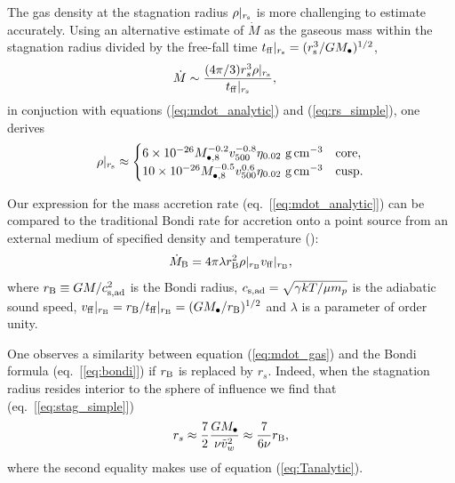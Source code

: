 \documentclass[usenatbib,fleqn]{mn2e}
\newcommand{\rs}{r_s}
\newcommand{\vw}{\tilde{v}_{w}}
\newcommand{\Mbh}[1][]{M_{\bullet#1}}
\newcommand{\Mbheight}{M_{\bullet,8}}
\newcommand{\tff}{t_{\rm ff}}
\newcommand{\densSlope}{\nu}
\begin{document}
The gas density at the stagnation radius $\rho|_{r_{\rm s}}$ is more challenging to estimate accurately.  Using an alternative estimate of $\dot{M}$ as the gaseous mass within the stagnation radius divided by the free-fall time $t_{\rm ff}|_{r_{\rm s}} = (r_{\rm s}^{3}/GM_{\bullet})^{1/2}$,
\begin{align}
  &\dot{M}\sim\frac{(4 \pi/3) \rs^3 \rho|_{r_{\rm s}}}{\tff|_{r_{\rm s}}},
  \label{eq:mdot_gas}
\end{align}
 in conjuction with equations (\ref{eq:mdot_analytic}) and (\ref{eq:rs_simple}), one derives
\begin{align}
  \rho|_{r_{\rm s}}\approx
  \begin{cases}
    6 \times 10^{-26} \Mbheight^{-0.2} v_{500}^{-0.8}  \eta_{0.02} \,
    \, {\rm g \, cm^{-3}}& \text{core},\\
    10 \times 10^{-26}  \Mbheight^{-0.5} v_{500}^{0.6}  \eta_{0.02} \,\, {\rm g \,cm^{-3}} & \text{cusp}.
  \end{cases}
  \label{eq:rhors}
\end{align}


Our expression for the mass accretion rate (eq.~[\ref{eq:mdot_analytic}]) can be compared to the traditional Bondi rate for accretion onto a point source from an external medium of specified density and temperature (\citealt{Bondi52}):
\begin{align}
  \dot{M}_{\rm B} =4\pi \lambda r_{\rm B}^2 \rho|_{r_{\rm B}}v_{\rm ff}|_{r_{\rm B}},
\label{eq:bondi}
\end{align}
where $r_{\rm B} \equiv GM/c_{\rm s,ad}^{2}$ is the Bondi radius, $c_{\rm s,ad} = \sqrt{\gamma kT/\mu m_p}$ is the adiabatic sound speed, $v_{\rm ff}|_{r_{\rm B}} = r_{\rm B}/t_{\rm ff}|_{r_{\rm B}} = (GM_{\bullet}/r_{\rm B})^{1/2}$ and $\lambda$ is a parameter of order unity.  

One observes a similarity between equation (\ref{eq:mdot_gas}) and the Bondi formula (eq.~[\ref{eq:bondi}]) if $r_{\rm B}$ is replaced by $\rs$.  Indeed, when the stagnation radius resides interior to the sphere of influence we find that (eq.~[\ref{eq:stag_simple}])
\begin{align}
  \rs\approx\frac{7}{2}\frac{G \Mbh}{\densSlope \vw^2} \approx
  \frac{7}{6 \densSlope}r_{\rm B},
  \label{eq:rs_simple}
\end{align}
where the second equality makes use of equation (\ref{eq:Tanalytic}).  
\end{document}
